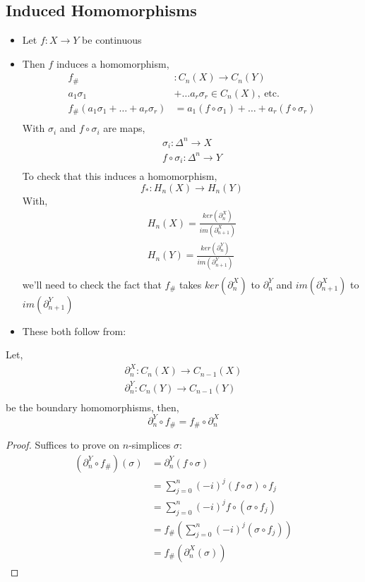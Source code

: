 \documentclass[../notes.tex]{subfiles}
\begin{document}
\subsection{Induced Homomorphisms}
\begin{itemize}
    \item
        Let $f:X\rightarrow Y$ be continuous
    \item Then $f$ induces a homomorphism,
        \begin{align*}
            f_{\#}&:C_n(X)\rightarrow C_n(Y)\\
            a_1\sigma_1&+\dots a_r\sigma_r\in C_n(X),\ \text{etc.}\\
            f_{\#}(a_1\sigma_1+\dots+a_r\sigma_r)&=
            a_1(f\circ \sigma_1)+\dots+a_r(f\circ \sigma_r)\\
        \end{align*}
        With $\sigma_i$ and $f\circ \sigma_i$ are maps,
        \begin{align*}
            \sigma_i:\Delta^n\rightarrow X\\
            f\circ\sigma_i:\Delta^n\rightarrow Y\\
        \end{align*}
        To check that this induces a homomorphism,
        \[
            f_*:H_n(X)\rightarrow H_n(Y)
        \]
        With,
        \begin{align*}
            H_n(X)=\frac{ker(\partial_n^X)}{im(\partial_{n+1}^X)}\\
            H_n(Y)=\frac{ker(\partial_n^Y)}{im(\partial_{n+1}^Y)}\\
        \end{align*}
        we'll need to check the fact that $f_{\#}$ takes $ker(\partial_n^X)$ to
        $\partial_n^Y$ and $im(\partial_{n+1}^X)$ to $im(\partial_{n+1}^Y)$
    \item These both follow from:
\end{itemize}
\begin{lemma}
    Let,
    \begin{align*}
        \partial_n^X:C_n(X)\rightarrow C_{n-1}(X)\\
        \partial_n^Y:C_n(Y)\rightarrow C_{n-1}(Y)\\
    \end{align*}
    be the boundary homomorphisms, then,
    \[
        \partial_n^Y\circ f_{\#}=f_{\#}\circ\partial_n^X
    \]
\end{lemma}
\begin{proof}
    Suffices to prove on $n$-simplices $\sigma$:
    \begin{align*}
        (\partial_n^Y\circ f_{\#})(\sigma)&=\partial_n^Y(f\circ \sigma)\\
        &=\sum_{j=0}^n(-i)^j(f\circ \sigma)\circ f_j\\
        &=\sum_{j=0}^n(-i)^jf\circ(\sigma\circ f_j)\\
        &=f_{\#}(\sum_{j=0}^n(-i)^j(\sigma\circ f_j))\\
        &=f_{\#}(\partial_n^X(\sigma))
    \end{align*}
\end{proof}
\end{document}
